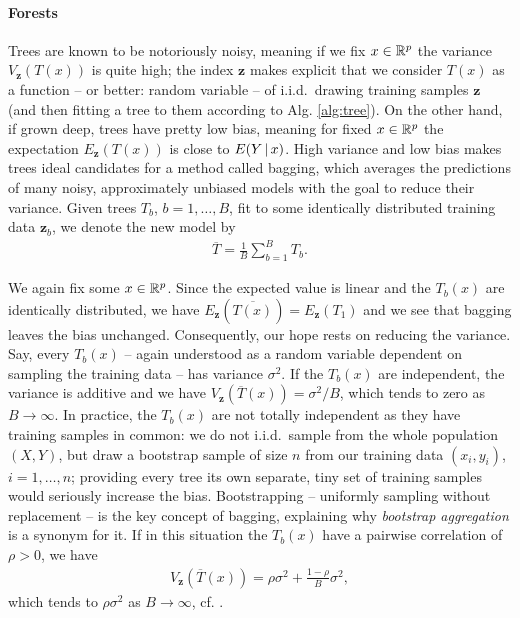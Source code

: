 \paragraph{Forests}
Trees are known to be notoriously noisy, meaning if we fix $x \in \mathbb{R}^p$ the variance 
$V_\mathbf{z}(T(x))$ is quite high; the index $\mathbf{z}$ makes explicit that we consider $T(x)$ as 
a function -- or better: random variable -- of i.i.d.\ drawing training samples $\mathbf{z}$ (and 
then fitting a tree to them according to Alg. \ref{alg:tree}). On the other hand, if grown deep,
trees have pretty low bias, meaning for fixed $x \in \mathbb{R}^p$ the expectation $E_\mathbf{z}(T(x))$ 
is close to $E(Y \,|\, x)$. High variance and low bias makes trees 
ideal candidates for a method called bagging, which averages the predictions of many noisy, 
approximately unbiased models with the goal to reduce their variance. Given trees $T_b$, $b = 1, 
\ldots, B$, fit to some identically distributed training data $\mathbf{z}_b$, we denote the new model by 
\begin{align}
    \overline{T} = \frac{1}{B} \sum_{b=1}^B T_b.
\end{align}

We again fix some $x \in \mathbb{R}^p$. Since the expected value is linear and the $T_b(x)$ are identically 
distributed, we have $E_\mathbf{z}(\overline{T(x)}) = E_\mathbf{z}(T_1)$ and we see that bagging 
leaves the bias unchanged. Consequently, our hope rests on reducing the variance. Say, every 
$T_b(x)$ -- again understood as a random variable dependent on sampling the training data -- has 
variance $\sigma^2$. If the $T_b(x)$ are independent, the variance is additive and we have 
$V_\mathbf{z}(\overline{T}(x)) = \sigma^2/B$, which tends to zero as $B \to \infty$. In practice, 
the $T_b(x)$ are not totally independent as they have training samples in common: we do not i.i.d.\ 
sample from the whole population $(X, Y)$, but draw a bootstrap sample of size $n$ from our training 
data $(x_i, y_i)$, $i = 1, \ldots, n$; providing every 
tree its own separate, tiny set of training samples would seriously increase the bias. Bootstrapping 
-- uniformly sampling without replacement -- is the key concept of bagging, explaining why 
\textit{bootstrap aggregation} is a synonym for it. If in this 
situation the $T_b(x)$ have a pairwise correlation of $\rho > 0$, we have 
\begin{align}
    V_\mathbf{z}\left(\overline{T}(x)\right) = \rho \sigma^2 + \frac{1-\rho}{B} \sigma^2,
\end{align}
which tends to $\rho \sigma^2$ as $B \to \infty$, cf. \cite[Eq. (15.1)]{elem-stat-learn01}.

